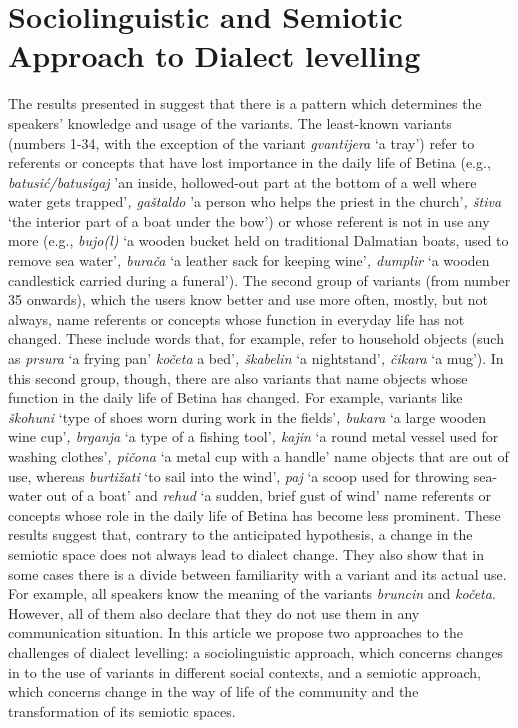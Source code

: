 \documentclass[output=paper]{LSP/langsci}
\begin{document}
\section{Sociolinguistic and Semiotic Approach to Dialect levelling}
The results presented in  suggest that there is a pattern which determines the speakers’ knowledge and usage of the variants. The least-known variants (numbers 1-34, with the exception of the variant \textit{gvantijera }‘a tray’) refer to referents or concepts that have lost importance in the daily life of Betina (e.g., \textit{batusić/batusigaj }'an inside, hollowed-out part at the bottom of a well where water gets trapped'\textit{, gaštaldo }'a person who helps the priest in the church'\textit{, štiva }‘the interior part of a boat under the bow') or whose referent is not in use any more (e.g., \textit{bujo(l) }‘a wooden bucket held on traditional Dalmatian boats, used to remove sea water’\textit{, burača }‘a leather sack for keeping wine’\textit{, dumplir }‘a wooden candlestick carried during a funeral’). The second group of variants (from number 35 onwards), which the users know better and use more often, mostly, but not always, name referents or concepts whose function in everyday life has not changed. These include words that, for example, refer to household objects (such as \textit{prsura }‘a frying pan’\textit{ kočeta }a bed’\textit{, škabelin }‘a nightstand’\textit{, čikara }‘a mug’). In this second group, though, there are also variants that name objects whose function in the daily life of Betina has changed. For example, variants like \textit{škohuni }‘type of shoes worn during work in the fields’\textit{, bukara }‘a large wooden wine cup’\textit{, brganja }‘a type of a fishing tool’\textit{, kajin }‘a round metal vessel used for washing clothes’\textit{, pičona }‘a metal cup with a handle’ name objects that are out of use, whereas \textit{burtižati }‘to sail into the wind’, \textit{paj} ‘a scoop used for throwing sea-water out of a boat’ and \textit{rehud} ‘a sudden, brief gust of wind’ name referents or concepts whose role in the daily life of Betina has become less prominent\textit{. }These results suggest that, contrary to the anticipated hypothesis, a change in the semiotic space does not always lead to dialect change. They also show that in some cases there is a divide between familiarity with a variant and its actual use. For example, all speakers know the meaning of the variants \textit{bruncin }and \textit{kočeta}. However, all of them also declare that they do not use them in any communication situation. In this article we propose two approaches to the challenges of dialect levelling: a sociolinguistic approach, which concerns changes in to the use of variants in different social contexts, and a semiotic approach, which concerns change in the way of life of the community and the transformation of its semiotic spaces.
\end{document}
